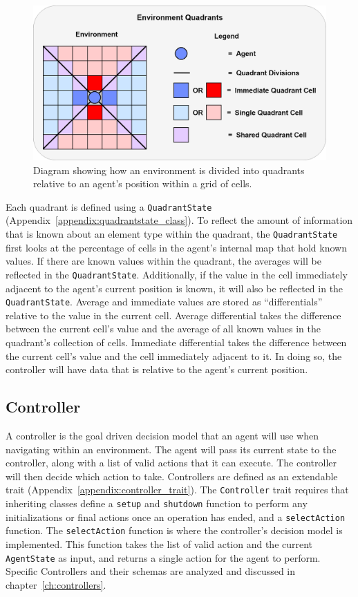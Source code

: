 \begin{figure}[H]
  \centering
  \includegraphics[width=1.0\columnwidth]{Figures/quadrants.png}
  \caption{Diagram showing how an environment is divided into quadrants relative to an agent's position within a grid of cells.}
  \label{fig:quadrants}
\end{figure}

Each quadrant is defined using a \texttt{QuadrantState} (Appendix~\ref{appendix:quadrantstate_class}).
To reflect the amount of information that is known about an element type within the quadrant, the \texttt{QuadrantState} first looks at the percentage of cells in the agent's internal map that hold known values.
If there are known values within the quadrant, the averages will be reflected in the \texttt{QuadrantState}.
Additionally, if the value in the cell immediately adjacent to the agent's current position is known, it will also be reflected in the \texttt{QuadrantState}.
Average and immediate values are stored as ``differentials'' relative to the value in the current cell.
Average differential takes the difference between the current cell's value and the average of all known values in the quadrant's collection of cells.
Immediate differential takes the difference between the current cell's value and the cell immediately adjacent to it.
In doing so, the controller will have data that is relative to the agent's current position.


\subsection{Controller} \label{subsec:controller}
A controller is the goal driven decision model that an agent will use when navigating within an environment.
The agent will pass its current state to the controller, along with a list of valid actions that it can execute.
The controller will then decide which action to take.
Controllers are defined as an extendable trait (Appendix~\ref{appendix:controller_trait}).
The \texttt{Controller} trait requires that inheriting classes define a \texttt{setup} and \texttt{shutdown} function to perform any initializations or final actions once an operation has ended, and a \texttt{selectAction} function.
The \texttt{selectAction} function is where the controller's decision model is implemented.
This function takes the list of valid action and the current \texttt{AgentState} as input, and returns a single action for the agent to perform.
Specific Controllers and their schemas are analyzed and discussed in chapter~\ref{ch:controllers}.




